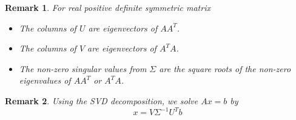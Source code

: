 \documentclass[a4paper]{article}
\theoremstyle{definition}
\theoremstyle{plain}
\newtheorem{remark}{Remark}
\begin{document}
\begin{remark}
For real positive definite symmetric matrix
\begin{itemize}
    \item The columns of $U$ are eigenvectors of $AA^T$.
    \item The columns of $V$ are eigenvectors of $A^TA$.
    \item The non-zero singular values from $\Sigma$ are the square roots of the non-zero eigenvalues of $AA^T$ or $A^TA$.
\end{itemize}
\end{remark}

\begin{remark}
Using the SVD decomposition, we solve $Ax=b$ by
\begin{equation*}
     x=V\Sigma^{-1} U^Tb
\end{equation*}
\end{remark}
\end{document}
